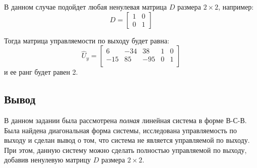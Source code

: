 В данном случае подойдет любая ненулевая матрица $D$ размера $2\times 2$, например: 
\begin{equation}
    D = \begin{bmatrix}
        1 & 0 \\
        0 & 1
    \end{bmatrix}
\end{equation}

Тогда матрица управляемости по выходу будет равна:
\begin{equation}
    \hat{U}_y = \begin{bmatrix}
        6  & -34  & 38  & 1  & 0 \\ 
        -15  & 85  & -95  & 0  & 1 \\ 
        \end{bmatrix}
\end{equation}
и ее ранг будет равен 2.

\FloatBarrier
\subsection{Вывод}
В данном задании была рассмотрена \textit{полная} линейная система 
в форме В-С-В. Была найдена диагональная форма системы, исследована управляемость
по выходу и сделан вывод о том, что система не является управляемой по выходу. 
При этом, данную систему можно сделать полностью управляемой по выходу, добавив
ненулевую матрицу $D$ размера $2\times 2$. 